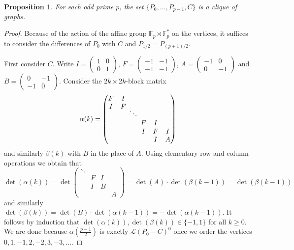 \documentclass{amsart}
\theoremstyle{plain}
\newtheorem{proposition}[theorem]{Proposition}
\theoremstyle{definition}
\newcommand{\F}{\ensuremath{\mathbb{F}}}
\begin{document}
\begin{proposition}
	For each odd prime \(p\), the set \(\{P_0,\dotsc,P_{p-1},C\}\) is a clique of graphs.
\end{proposition}
\begin{proof}
	Because of the action of the affine group \(\F_p\rtimes\F_p^*\) on the vertices, it suffices to consider the differences of \(P_0\) with \(C\) and \(P_{1/2}=P_{(p+1)/2}\).
	
	First consider \(C\). Write \(I=\left(\begin{smallmatrix} 1 & 0 \\ 0 & 1 \end{smallmatrix}\right)\), \(F=\left(\begin{smallmatrix} -1 & -1 \\ -1 & -1 \end{smallmatrix}\right)\), \(A=\left(\begin{smallmatrix} -1 & 0 \\ 0 & -1 \end{smallmatrix}\right)\) and \(B=\left(\begin{smallmatrix} 0 & -1 \\ -1 & 0 \end{smallmatrix}\right)\). Consider the \(2k\times 2k\)-block matrix 
	\[\alpha(k)=\begin{pmatrix}F & I & \\ I & F \\ & & \!\!\!\smash{\ddots}\!\!\! \\ & & & F & I \\ & & & I & F & I \\ & & & & I & A \end{pmatrix}\]
	and similarly \(\beta(k)\) with \(B\) in the place of \(A\). Using elementary row and column operations we obtain that
	\[\det(\alpha(k)) = \det\begin{pmatrix}\ddots\!\!\! \\ & F & I \\ & I & B &  \\ & &  & A \end{pmatrix} = \det(A)\cdot \det(\beta(k-1)) =\det(\beta(k-1))\]
	and similarly \(\det(\beta(k))=\det(B)\cdot\det(\alpha(k-1))=-\det(\alpha(k-1))\). It follows by induction that \(\det(\alpha(k)),\det(\beta(k))\in\{-1,1\}\) for all \(k\geq0\). We are done because \(\alpha(\frac{p-1}{2})\) is exactly \(\mathcal{L}(P_0-C)^0\) once we order the vertices \(0,1,-1,2,-2,3,-3,\dotsc\).
	

\end{proof}
\end{document}

